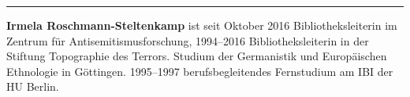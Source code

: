 \begin{center}\rule{0.5\linewidth}{\linethickness}\end{center}

\textbf{Irmela Roschmann-Steltenkamp} ist seit Oktober 2016
Bibliotheksleiterin im Zentrum für Antisemitismusforschung, 1994--2016
Bibliotheksleiterin in der Stiftung Topographie des Terrors. Studium der
Germanistik und Europäischen Ethnologie in Göttingen. 1995--1997
berufsbegleitendes Fernstudium am IBI der HU Berlin.
